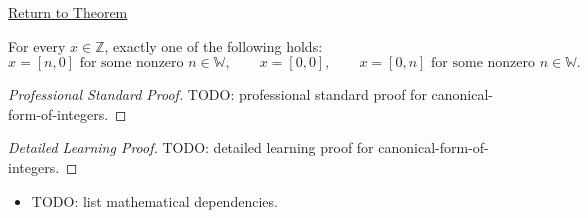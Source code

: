\newpage
{}
\label{prf:canonical-form-of-integers}

\begin{remark*}[Return]
\hyperref[thm:canonical-form-of-integers]{Return to Theorem}
\end{remark*}

\begin{theorem*}
For every $x\in\mathbb{Z}$, exactly one of the following holds:
\[
x=[n,0]\text{ for some nonzero }n\in\mathbb{W},\qquad
x=[0,0],\qquad
x=[0,n]\text{ for some nonzero }n\in\mathbb{W}.
\]
\end{theorem*}

\begin{proof}[Professional Standard Proof]
\LRAProofBodyStart
TODO: professional standard proof for canonical-form-of-integers.
\end{proof}

\begin{proof}[Detailed Learning Proof]
\LRAProofBodyStart
TODO: detailed learning proof for canonical-form-of-integers.
\end{proof}

\begin{remark*}
\end{remark*}

\begin{dependencies}
\begin{itemize}
  \item TODO: list mathematical dependencies.
\end{itemize}
\end{dependencies}

\clearpage

